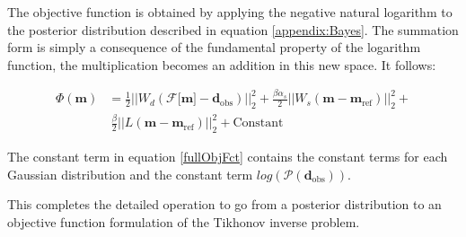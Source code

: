\documentclass[extra]{gji} %
\begin{document}
The objective function is obtained by applying the negative natural logarithm to the posterior distribution described in equation \ref{appendix:Bayes}. The summation form is simply a consequence of the fundamental property of the logarithm function, the multiplication becomes an addition in this new space. It follows:

\begin{align}
\Phi(\mathbf{m}) &= \frac{1}{2}||W_d(\mathcal{F}\lbrack\mathbf{m}\rbrack-\mathbf{d}_{\text{obs}})||_2^2 + \frac{\beta\alpha_s}{2}||W_s(\mathbf{m}-\mathbf{m}_{{\text{ref}}})||_2^2 + \nonumber\\  &~\frac{\beta}{2}||L(\mathbf{m}-\mathbf{m}_{{\text{ref}}})||_2^2 +\text{Constant} \label{fullObjFct}
\end{align}

The constant term in equation \ref{fullObjFct} contains the constant terms for each Gaussian distribution and the constant term $log(\mathcal{P}(\mathbf{d}_{\text{obs}}))$.

This completes the detailed operation to go from a posterior distribution to an objective function formulation of the Tikhonov inverse problem.


 \label{Appendix:full_conjugate}
\end{document}
